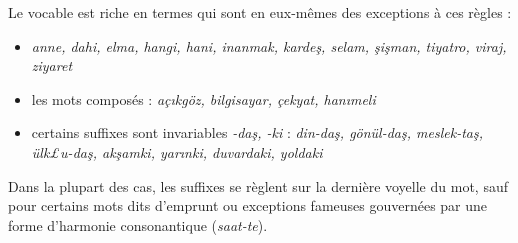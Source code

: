 \documentclass{cours}
\newcommand{\ch}{\c{s}}
\begin{document}
Le vocable est riche en termes qui sont en eux-mêmes des exceptions à ces règles :
\begin{itemize}
    \item \textit{anne, dahi, elma, hangi, hani, inanmak, karde\ch, selam, \ch i\ch man, tiyatro, viraj, ziyaret}
    \item les mots composés : \textit{aç\i kgöz, bilgisayar, çekyat, han\i meli}
    \item certains suffixes sont invariables {\it -da\ch, -ki} : \textit{din-da\ch, gönül-da\ch, meslek-ta\ch, ülk£u-da\ch, ak\ch amki, yar\i nki, duvardaki, yoldaki}
\end{itemize}
Dans la plupart des cas, les suffixes se règlent sur la dernière voyelle du mot, sauf pour certains mots dits \og d'emprunt \fg ou exceptions fameuses gouvernées par une forme d'harmonie consonantique ({\it saat-te}).
\end{document}
